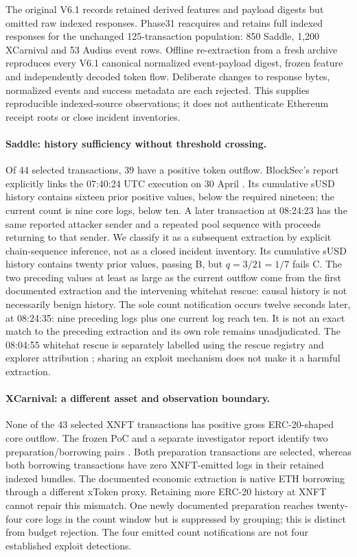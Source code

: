 \documentclass[preprint,12pt,authoryear]{elsarticle}
\begin{document}
The original V6.1 records retained derived features and payload digests but omitted raw indexed responses. Phase31 reacquires and retains full indexed responses for the unchanged 125-transaction population: 850 Saddle, 1,200 XCarnival and 53 Audius event rows. Offline re-extraction from a fresh archive reproduces every V6.1 canonical normalized event-payload digest, frozen feature and independently decoded token flow. Deliberate changes to response bytes, normalized events and success metadata are each rejected. This supplies reproducible indexed-source observations; it does not authenticate Ethereum receipt roots or close incident inventories.

\paragraph{Saddle: history sufficiency without threshold crossing.}
Of 44 selected transactions, 39 have a positive token outflow. BlockSec's report explicitly links the 07:40:24 UTC execution on 30 April \citep{BlockSec2022Saddle}. Its cumulative sUSD history contains sixteen prior positive values, below the required nineteen; the current count is nine core logs, below ten. A later transaction at 08:24:23 has the same reported attacker sender and a repeated pool sequence with proceeds returning to that sender. We classify it as a subsequent extraction by explicit chain-sequence inference, not as a closed incident inventory. Its cumulative sUSD history contains twenty prior values, passing B, but $q=3/21=1/7$ fails C. The two preceding values at least as large as the current outflow come from the first documented extraction and the intervening whitehat rescue: causal history is not necessarily benign history. The sole count notification occurs twelve seconds later, at 08:24:35: nine preceding logs plus one current log reach ten. It is not an exact match to the preceding extraction and its own role remains unadjudicated. The 08:04:55 whitehat rescue is separately labelled using the rescue registry and explorer attribution \citep{SEAL2026Rescues}; sharing an exploit mechanism does not make it a harmful extraction.

\paragraph{XCarnival: a different asset and observation boundary.}
None of the 43 selected XNFT transactions has positive gross ERC-20-shaped core outflow. The frozen PoC and a separate investigator report identify two preparation/borrowing pairs \citep{DeFiHackLabs2026,SlowMist2022XCarnival}. Both preparation transactions are selected, whereas both borrowing transactions have zero XNFT-emitted logs in their retained indexed bundles. The documented economic extraction is native ETH borrowing through a different xToken proxy. Retaining more ERC-20 history at XNFT cannot repair this mismatch. One newly documented preparation reaches twenty-four core logs in the count window but is suppressed by grouping; this is distinct from budget rejection. The four emitted count notifications are not four established exploit detections.
\end{document}
